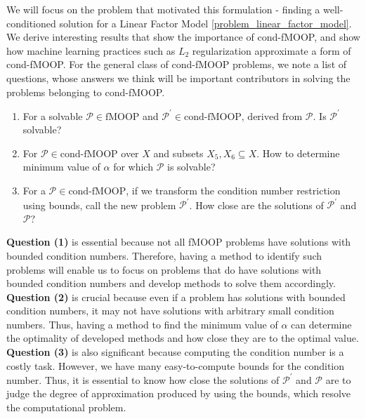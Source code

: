 We will focus on the problem that motivated this formulation - finding a well-conditioned solution for a Linear Factor Model \ref{problem_linear_factor_model}. \newline We derive interesting results that show the importance of cond-fMOOP, and show how machine learning practices such as $L_2$ regularization approximate a form of cond-fMOOP. \newline For the general class of cond-fMOOP problems, we note a list of questions, whose answers we think will be important contributors in solving the problems belonging to cond-fMOOP.
\begin{enumerate} \label{important_questions}
\setlength\itemsep{-1pt}
    \item For a solvable $\mathcal{P} \in \text{fMOOP}$ and $\mathcal{P}^{'} \in \text{cond-fMOOP, derived from } \mathcal{P}$. Is $\mathcal{P}^{'}$ solvable?
    \item For $\mathcal{P} \in \text{cond-fMOOP}$ over $X$ and subsets $X_5,X_6 \subseteq X$. How to determine minimum value of $\alpha$ for which $\mathcal{P}$ is solvable?
    \item For a $\mathcal{P} \in \text{cond-fMOOP}$, if we transform the condition number restriction using bounds, call the new problem $\mathcal{P}^{'}$. How close are the solutions of $\mathcal{P}^{'}$ and $\mathcal{P}$? \label{question_transformed_problems_behaviour}
\end{enumerate} \textbf{Question (1)} is essential because not all fMOOP problems have solutions with bounded condition numbers. Therefore, having a method to identify such problems will enable us to focus on problems that do have solutions with bounded condition numbers and develop methods to solve them accordingly. \textbf{Question (2)} is crucial because even if a problem has solutions with bounded condition numbers, it may not have solutions with arbitrary small condition numbers. Thus, having a method to find the minimum value of $\alpha$ can determine the optimality of developed methods and how close they are to the optimal value. \textbf{Question (3)} is also significant because computing the condition number is a costly task. However, we have many easy-to-compute bounds for the condition number. Thus, it is essential to know how close the solutions of $\mathcal{P}^{'}$ and $\mathcal{P}$ are to judge the degree of approximation produced by using the bounds, which resolve the computational problem.
\newpage 
{}
